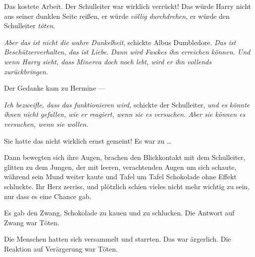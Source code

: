 Das kostete Arbeit. Der Schulleiter war wirklich verrückt! Das würde Harry nicht aus seiner dunklen Seite reißen, er würde \emph{völlig durchdrehen}, er würde den Schulleiter \emph{töten}.

\emph{Aber das ist nicht die wahre Dunkelheit}, schickte Albus Dumbledore. \emph{Das ist Beschützerverhalten, das ist Liebe}. \emph{Dann wird Fawkes ihn erreichen können. Und wenn Harry sieht, dass Minerva doch noch lebt, wird er ihn vollends zurückbringen.}

Der Gedanke kam zu Hermine —

\emph{Ich bezweifle, dass das funktionieren wird,} schickte der Schulleiter, \emph{und es könnte ihnen nicht gefallen, wie er reagiert, wenn sie es versuchen. Aber sie können es versuchen, wenn sie wollen.}

Sie hatte das nicht wirklich ernst gemeint! Es war zu …

Dann bewegten sich ihre Augen, brachen den Blickkontakt mit dem Schulleiter, glitten zu dem Jungen, der mit leeren, verachtenden Augen um sich schaute, während sein Mund weiter kaute und Tafel um Tafel Schokolade ohne Effekt schluckte. Ihr Herz zerriss, und plötzlich schien vieles nicht mehr wichtig zu sein, nur dass es eine Chance gab.

\later

Es gab den Zwang, Schokolade zu kauen und zu schlucken. Die Antwort auf Zwang war Töten.

Die Menschen hatten sich versammelt und starrten. Das war ärgerlich. Die Reaktion auf Verärgerung war Töten.

